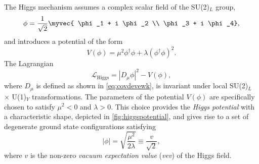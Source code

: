 The Higgs mechanism assumes a complex scalar field of the SU(2)$_L$ group,
\begin{equation}
  \phi = \frac{1}{\sqrt{2}} \myvec { \phi_1 + i \phi_2 \\ \phi_3 + i \phi_4},
\end{equation}
and introduces a potential of the form
\begin{equation}
  V(\phi) = \mu^2\phi^\dagger\phi + \lambda \left(\phi^\dagger\phi \right)^2.
  \label{eq:higgspotential}
\end{equation}
The Lagrangian
\begin{equation}
  \mathcal{L}_{\text{Higgs}} = |D_\mu\phi|^2 - V(\phi), %
  \label{eq:lagrangianhiggs}
\end{equation}
where $D_\mu$ is defined as shown in \cref{eq:covdevewk}, is invariant under local SU(2)$_L$ $\times$ U(1)$_Y$ transformations.
The parameters of the potential $V(\phi)$ are specifically chosen to satisfy $\mu^2 < 0$ and $\lambda > 0$.
This choice provides the \emph{Higgs potential} with a characteristic shape, depicted in \cref{fig:higgspotential}, and gives rise to a set of degenerate ground state configurations satisfying
\begin{equation}
  |\phi| = \sqrt{ \frac{\mu^2}{2\lambda} } \equiv \frac{ v }{\sqrt{2}},
  \label{eq:higgsminima}
\end{equation}
where $v$ is the non-zero \emph{vacuum expectation value} (\emph{vev}) of the Higgs field.

